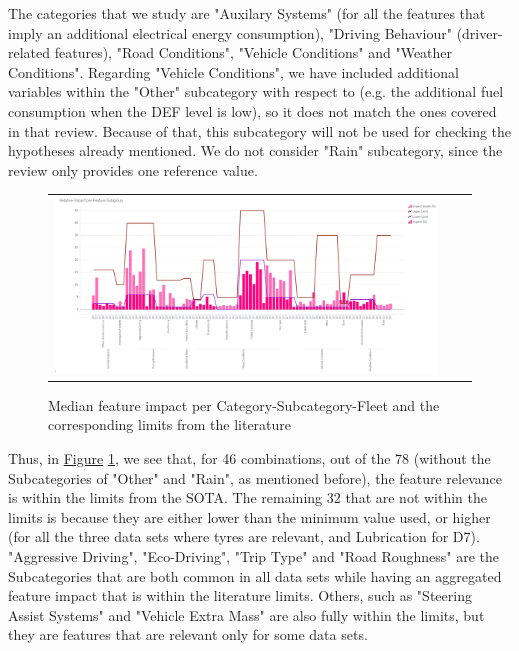 The categories that we study are "Auxilary Systems" (for all the features that imply an additional electrical energy consumption), "Driving Behaviour" (driver-related features), "Road Conditions", "Vehicle Conditions" and "Weather Conditions". Regarding "Vehicle Conditions", we have included additional variables within the "Other" subcategory with respect to \parencite{zacharof2016review} (e.g. the additional fuel consumption when the DEF level is low), so it does not match the ones covered in that review. Because of that, this subcategory will not be used for checking the hypotheses already mentioned. We do not consider "Rain" subcategory, since the review only provides one reference value.

\begin{figure}[h!]
\centering
 \begin{tabular}{c@{\qquad}c@{\qquad}c}
\includegraphics[width=0.95 \columnwidth]{figures/chapter6_LucaFleet/FeatureImpactperDataset.PNG}
  \end{tabular} 
  \caption{Median feature impact per Category-Subcategory-Fleet and the corresponding limits from the literature \parencite{zacharof2016review}  \label{figure:ch6-FeatureImpactperDataset}}
\end{figure}

Thus, in \hyperref[figure:ch6-FeatureImpactperDataset]{Figure} \ref{figure:ch6-FeatureImpactperDataset}, we see that, for 46 combinations, out of the 78 (without the Subcategories of "Other" and "Rain", as mentioned before), the feature relevance is within the limits from the SOTA. The remaining 32 that are not within the limits is because they are either lower than the minimum value used, or higher (for all the three data sets where tyres are relevant, and Lubrication for D7). "Aggressive Driving", "Eco-Driving", "Trip Type" and "Road Roughness" are the Subcategories that are both common in all data sets while having an aggregated feature impact that is within the literature limits. Others, such as "Steering Assist Systems" and "Vehicle Extra Mass" are also fully within the limits, but they are features that are relevant only for some data sets.

